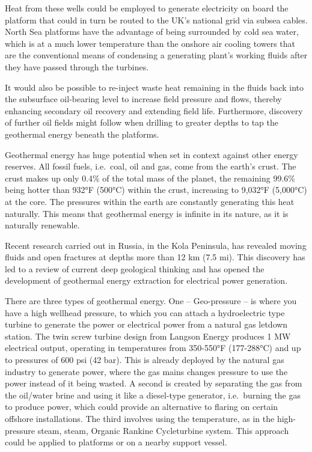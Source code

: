 \documentclass[
]{book}
\begin{document}
Heat from these wells could be employed to generate electricity on board the platform that could in turn be routed to the UK's national grid via subsea cables. North Sea platforms have the advantage of being surrounded by cold sea water, which is at a much lower temperature than the onshore air cooling towers that are the conventional means of condensing a generating plant's working fluids after they have passed through the turbines.

It would also be possible to re-inject waste heat remaining in the fluids back into the subsurface oil-bearing level to increase field pressure and flows, thereby enhancing secondary oil recovery and extending field life. Furthermore, discovery of further oil fields might follow when drilling to greater depths to tap the geothermal energy beneath the platforms.

Geothermal energy has huge potential when set in context against other energy reserves. All fossil fuels, i.e.~coal, oil and gas, come from the earth's crust. The crust makes up only 0.4\% of the total mass of the planet, the remaining 99.6\% being hotter than 932°F (500°C) within the crust, increasing to 9,032°F (5,000°C) at the core. The pressures within the earth are constantly generating this heat naturally. This means that geothermal energy is infinite in its nature, as it is naturally renewable.

Recent research carried out in Russia, in the Kola Peninsula, has revealed moving fluids and open fractures at depths more than 12 km (7.5 mi). This discovery has led to a review of current deep geological thinking and has opened the development of geothermal energy extraction for electrical power generation.

There are three types of geothermal energy. One -- Geo-pressure -- is where you have a high wellhead pressure, to which you can attach a hydroelectric type turbine to generate the power or electrical power from a natural gas letdown station. The twin screw turbine design from Langson Energy produces 1 MW electrical output, operating in temperatures from 350-550°F (177-288°C) and up to pressures of 600 psi (42 bar). This is already deployed by the natural gas industry to generate power, where the gas mains changes pressure to use the power instead of it being wasted. A second is created by separating the gas from the oil/water brine and using it like a diesel-type generator, i.e.~burning the gas to produce power, which could provide an alternative to flaring on certain offshore installations. The third involves using the temperature, as in the high-pressure steam, steam, Organic Rankine Cycleturbine system. This approach could be applied to platforms or on a nearby support vessel.
\end{document}
